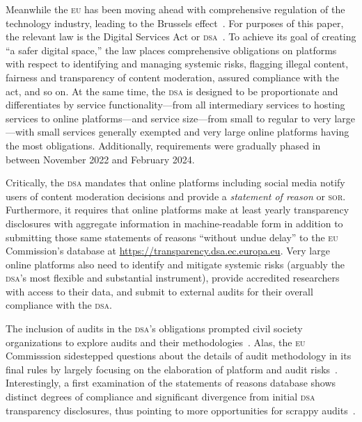 \documentclass[nonacm,screen]{acmart}
\newcommand\V[1]{\textsc{\MakeLowercase{#1}}}
\begin{document}
Meanwhile the \V{EU} has been moving ahead with comprehensive regulation of the
technology industry, leading to the Brussels effect~\cite{Bradford2020}. For
purposes of this paper, the relevant law is the Digital Services Act or
\V{DSA}~\cite{EuropeanParliamentAndCouncil2022}. To achieve its goal of creating
``a safer digital space,'' the law places comprehensive obligations on platforms
with respect to identifying and managing systemic risks, flagging illegal
content, fairness and transparency of content moderation, assured compliance
with the act, and so on. At the same time, the \V{DSA} is designed to be
proportionate and differentiates by service functionality---from all
intermediary services to hosting services to online platforms---and service
size---from small to regular to very large---with small services generally
exempted and very large online platforms having the most obligations.
Additionally, requirements were gradually phased in between November 2022 and
February 2024.

Critically, the \V{DSA} mandates that online platforms including social media
notify users of content moderation decisions and provide a \emph{statement of
reason} or \V{SoR}. Furthermore, it requires that online platforms make at least
yearly transparency disclosures with aggregate information in machine-readable
form in addition to submitting those same statements of reasons ``without undue
delay'' to the \V{EU} Commission's database at
\url{https://transparency.dsa.ec.europa.eu}. Very large online platforms also
need to identify and mitigate systemic risks (arguably the \V{DSA}'s most
flexible and substantial instrument), provide accredited researchers with access
to their data, and submit to external audits for their overall compliance with
the \V{DSA}.

The inclusion of audits in the \V{DSA}'s obligations prompted civil society
organizations to explore audits and their
methodologies~\cite{ActionCoalitionOnMeaningfulTransparency2023,AdaLovelaceInstitute2021,
BhatiaAllen2023,CostanzaChockRajiea2022,MessmerDegeling2023}. Alas, the \V{EU}
Commisssion sidestepped questions about the details of audit methodology in its
final rules by largely focusing on the elaboration of platform and audit
risks~\cite{EuropeanCommission2023}. Interestingly, a first examination of the
statements of reasons database shows distinct degrees of compliance and
significant divergence from initial \V{DSA} transparency disclosures, thus
pointing to more opportunities for scrappy audits~\cite{TrujilloFagniea2024}.
\end{document}
